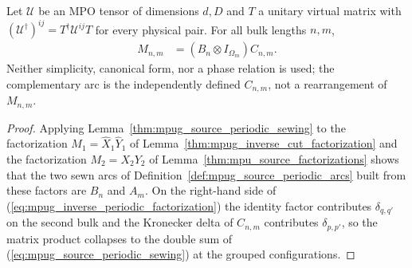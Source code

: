\begin{lemma}
    \label{thm:mpug_inverse_periodic_factorization}
    \leanok
    Let $\mathcal U$ be an MPO tensor of dimensions $d,D$ and $T$ a
    unitary virtual matrix with
    $(\mathcal U^\dagger)^{ij}=T^\dagger\mathcal U^{ij}T$ for every
    physical pair. For all bulk lengths $n,m$,
    \begin{align}
        M_{n,m} & =\left(B_n\otimes I_{\Omega_m}\right)C_{n,m}.
        \label{eq:mpug_inverse_periodic_factorization}
    \end{align}
    Neither simplicity, canonical form, nor a phase relation is used; the
    complementary arc is the independently defined $C_{n,m}$, not a
    rearrangement of $M_{n,m}$.
\end{lemma}
\begin{proof}\leanok
    Applying Lemma~\ref{thm:mpug_source_periodic_sewing} to the
    factorization $M_1=\widehat X_1\widehat Y_1$ of
    Lemma~\ref{thm:mpug_inverse_cut_factorization} and the factorization
    $M_2=X_2Y_2$ of Lemma~\ref{thm:mpu_source_factorizations} shows that
    the two sewn arcs of Definition~\ref{def:mpug_source_periodic_arcs}
    built from these factors are $B_n$ and $A_m$. On the right-hand side of
    (\ref{eq:mpug_inverse_periodic_factorization}) the identity factor
    contributes $\delta_{q,q'}$ on the second bulk and the Kronecker
    delta of $C_{n,m}$ contributes $\delta_{p,p'}$, so the matrix product
    collapses to the double sum of
    (\ref{eq:mpug_source_periodic_sewing}) at the grouped configurations.
\end{proof}

